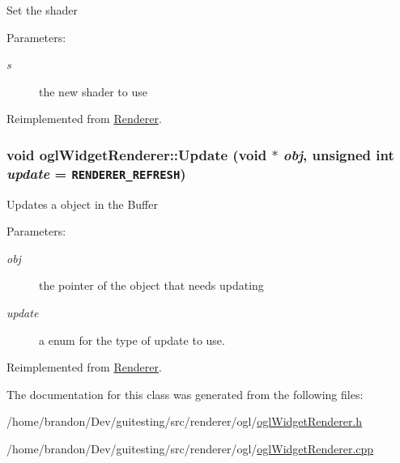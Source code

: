 Set the shader \begin{Desc}
\item[Parameters:]
\begin{description}
\item[{\em s}]the new shader to use \end{description}
\end{Desc}


Reimplemented from \hyperlink{class_renderer_d2e8b81f3a9eabfb39f9f046d0f3d3ca}{Renderer}.\hypertarget{classogl_widget_renderer_709ada8aa5e357dd916d48f74adbca07}{
\subsubsection[{Update}]{\setlength{\rightskip}{0pt plus 5cm}void oglWidgetRenderer::Update (void $\ast$ {\em obj}, \/  unsigned int {\em update} = {\tt RENDERER\_\-REFRESH})}}
\label{classogl_widget_renderer_709ada8aa5e357dd916d48f74adbca07}


Updates a object in the Buffer \begin{Desc}
\item[Parameters:]
\begin{description}
\item[{\em obj}]the pointer of the object that needs updating \item[{\em update}]a enum for the type of update to use. \end{description}
\end{Desc}


Reimplemented from \hyperlink{class_renderer_d2d2554ed238ba29baa9ffd6b3530ba4}{Renderer}.

The documentation for this class was generated from the following files:\begin{CompactItemize}
\item 
/home/brandon/Dev/guitesting/src/renderer/ogl/\hyperlink{ogl_widget_renderer_8h}{oglWidgetRenderer.h}\item 
/home/brandon/Dev/guitesting/src/renderer/ogl/\hyperlink{ogl_widget_renderer_8cpp}{oglWidgetRenderer.cpp}\end{CompactItemize}
